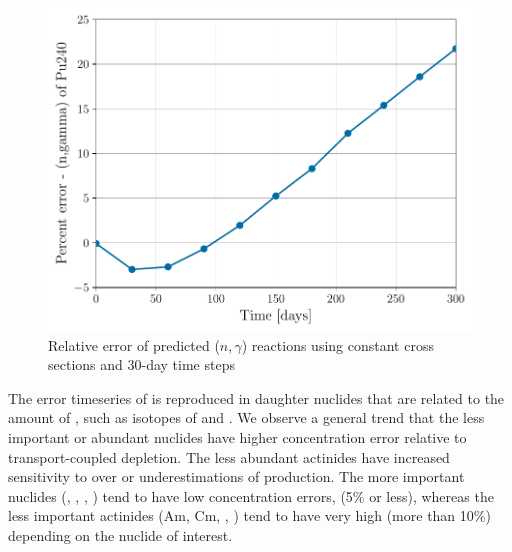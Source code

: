     \begin{figure}[htpb]
        \centering
        \includegraphics[width=\linewidth]{figs/pu240-n-gamma-months.pdf}
        \caption{Relative error of predicted  ($n,\gamma$)
            reactions using constant cross sections and 30-day time steps}
        \label{fig:pu240-n-gamma-months}
    \end{figure}

    The error timeseries of  is reproduced in daughter nuclides
    that are related to the amount of , such as isotopes of 
    and . We observe a general trend that the less important or abundant
    nuclides have higher concentration error relative to transport-coupled
    depletion. The less abundant actinides have increased sensitivity to over or
    underestimations of production.  The more important nuclides (,
    , , ) tend to have low concentration
    errors, (5\% or less), whereas the less important actinides (Am, Cm,
    , ) tend to have very high (more than 10\%)
    depending on the nuclide of interest.

